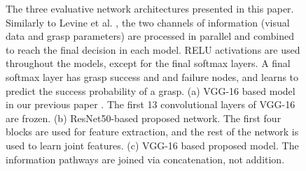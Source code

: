 \begin{figure}[t]
\centering



\caption{The three evaluative network architectures presented in this paper. Similarly to Levine et al. \cite{Levine1}, the two channels of information (visual data and grasp parameters) are processed in parallel and combined to reach the final decision in each model. RELU activations are used throughout the models, except for the final softmax layers. A final softmax layer has grasp success and and failure nodes, and learns to predict the success probability of a grasp. (a) VGG-16 based model in our previous paper \cite{icra}. The first 13 convolutional layers of VGG-16 are frozen. (b) ResNet50-based \cite{resnet} proposed network. The first four blocks are used for feature extraction, and the rest of the network is used to learn joint features. (c) VGG-16 based proposed model. The information pathways are joined via concatenation, not addition.}

\label{fig:networkArchitecture2}
\end{figure}

